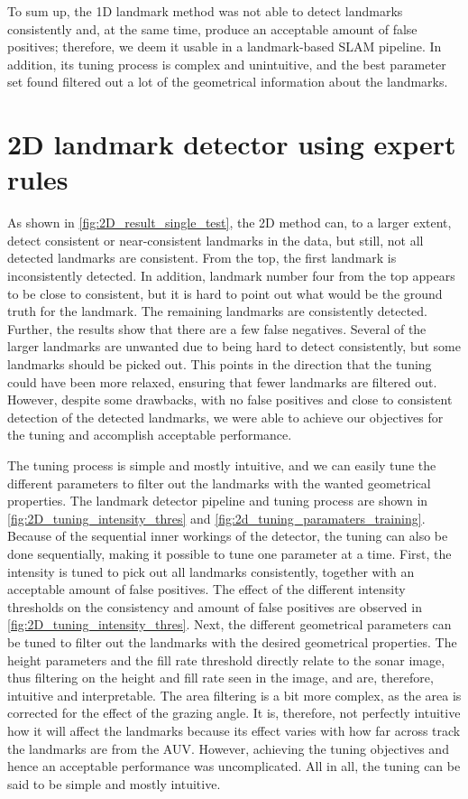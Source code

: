 To sum up, the 1D landmark method was not able to detect landmarks consistently and, at the same time, produce an acceptable amount of false positives; therefore, we deem it usable in a landmark-based SLAM pipeline. In addition, its tuning process is complex and unintuitive, and the best parameter set found filtered out a lot of the geometrical information about the landmarks. 

\section{2D landmark detector using expert rules}

As shown in \cref{fig:2D_result_single_test}, the 2D method can, to a larger extent, detect consistent or near-consistent landmarks in the data, but still, not all detected landmarks are consistent. From the top, the first landmark is inconsistently detected. In addition, landmark number four from the top appears to be close to consistent, but it is hard to point out what would be the ground truth for the landmark. The remaining landmarks are consistently detected. Further, the results show that there are a few false negatives. Several of the larger landmarks are unwanted due to being hard to detect consistently, but some landmarks should be picked out. This points in the direction that the tuning could have been more relaxed, ensuring that fewer landmarks are filtered out. However, despite some drawbacks, with no false positives and close to consistent detection of the detected landmarks, we were able to achieve our objectives for the tuning and accomplish acceptable performance. 

The tuning process is simple and mostly intuitive, and we can easily tune the different parameters to filter out the landmarks with the wanted geometrical properties. The landmark detector pipeline and tuning process are shown in \cref{fig:2D_tuning_intensity_thres} and \cref{fig:2d_tuning_paramaters_training}. Because of the sequential inner workings of the detector, the tuning can also be done sequentially, making it possible to tune one parameter at a time. First, the intensity is tuned to pick out all landmarks consistently, together with an acceptable amount of false positives. The effect of the different intensity thresholds on the consistency and amount of false positives are observed in \cref{fig:2D_tuning_intensity_thres}. Next, the different geometrical parameters can be tuned to filter out the landmarks with the desired geometrical properties. The height parameters and the fill rate threshold directly relate to the sonar image, thus filtering on the height and fill rate seen in the image, and are, therefore, intuitive and interpretable. The area filtering is a bit more complex, as the area is corrected for the effect of the grazing angle. It is, therefore, not perfectly intuitive how it will affect the landmarks because its effect varies with how far across track the landmarks are from the AUV. However, achieving the tuning objectives and hence an acceptable performance was uncomplicated. All in all, the tuning can be said to be simple and mostly intuitive. 

